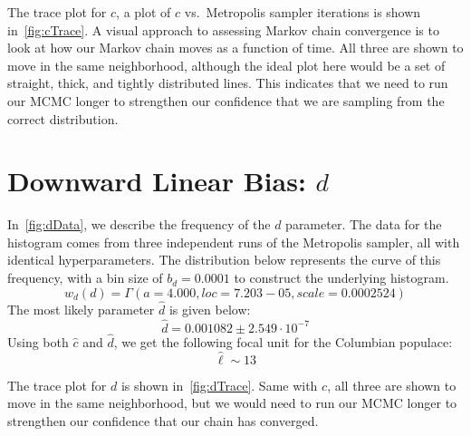 The trace plot for $c$, a plot of $c$ vs.\ Metropolis sampler iterations is shown in~\autoref{fig:cTrace}.
A visual approach to assessing Markov chain convergence is to look at how our Markov chain moves as a function of
time.
All three are shown to move in the same neighborhood, although the ideal plot here would be a set of straight, thick,
and tightly distributed lines.
This indicates that we need to run our MCMC longer to strengthen our confidence that we are sampling from the
correct distribution.

\section{Downward Linear Bias: $d$}\label{sec:downwardLinearBias}

In~\autoref{fig:dData}, we describe the frequency of the $d$ parameter.
The data for the histogram comes from three independent runs of the Metropolis sampler, all with identical
hyperparameters.
The distribution below represents the curve of this frequency, with a bin size of $b_d = 0.0001$ to construct the
underlying histogram.
\begin{equation}
    w_d(d) = \Gamma(a = 4.000, \mathit{loc} = 7.203-05, \mathit{scale} = 0.0002524)
\end{equation}
The most likely parameter $\hat{d}$ is given below:
\begin{equation}
    \hat{d} = 0.001082 \pm 2.549 \cdot 10^{-7}
\end{equation}
Using both $\hat{c}$ and $\hat{d}$, we get the following focal unit for the Columbian populace:
\begin{equation}
    \hat{\ell} \sim 13
\end{equation}

The trace plot for $d$ is shown in~\autoref{fig:dTrace}.
Same with $c$, all three are shown to move in the same neighborhood, but we would need to run our MCMC longer
to strengthen our confidence that our chain has converged.


